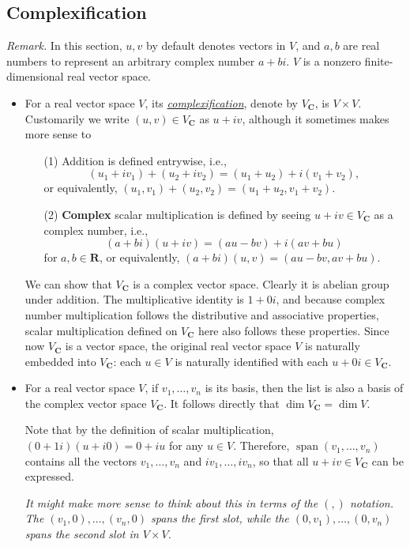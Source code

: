 \documentclass{article}
\newcommand{\df}[1]{\ul{\textit{#1}}}
\newcommand{\R}{\mathbf{R}}
\newcommand{\C}{\mathbf{C}}
\newcommand{\s}{\operatorname{span}}
\renewcommand{\d}{\dim}
\begin{document}
\subsection{Complexification}
\textit{Remark.} In this section, $u,v$ by default denotes vectors in $V$, and $a,b$ are real numbers to represent an arbitrary complex number $a+bi$. $V$ is a nonzero finite-dimensional real vector space.
\begin{itemize}
    \item For a real vector space $V$, its \df{complexification}, denote by $V_\C$, is $V \times V$. Customarily we write $(u,v) \in V_\C$ as $u + iv$, although it sometimes makes more sense to \emph{}
    \begin{enumerate}
        \item [(1)] Addition is defined entrywise, i.e., \[(u_1+iv_1)+(u_2+iv_2)=(u_1+u_2)+i(v_1+v_2),\] or equivalently, $(u_1,v_1)+(u_2,v_2) = (u_1+u_2,v_1+v_2)$.
        \item [(2)] \textbf{Complex} scalar multiplication is defined by seeing $u+iv \in V_\C$ as a complex number, i.e., \[(a+bi)(u+iv) = (au-bv)+i(av+bu)\] for $a,b \in \R$, or equivalently, $(a+bi)(u,v) = (au-bv,av+bu)$.
    \end{enumerate}

    We can show that $V_\C$ is a complex vector space. Clearly it is abelian group under addition. The multiplicative identity is $1+0i$, and because complex number multiplication follows the distributive and associative properties, scalar multiplication defined on $V_\C$ here also follows these properties. Since now $V_\C$ is a vector space, the original real vector space $V$ is naturally embedded into $V_\C$: each $u \in V$ is naturally identified with each $u+0i \in V_\C$.
    \item For a real vector space $V$, if $v_1,\dots,v_n$ is its basis, then the list is also a basis of the complex vector space $V_\C$. It follows directly that $\d V_\C = \d V$.

    Note that by the definition of scalar multiplication, $(0+1i)(u+i0) = 0+iu$ for any $u \in V$. Therefore, $\s(v_1,\dots,v_n)$ contains all the vectors $v_1,\dots,v_n$ and $iv_1,\dots,iv_n$, so that all $u+iv \in V_\C$ can be expressed.
    
    \emph{It might make more sense to think about this in terms of the $(,)$ notation. The $(v_1,0),\dots,(v_n,0)$ spans the first slot, while the $(0,v_1),\dots,(0,v_n)$ spans the second slot in $V \times V$.}


\end{itemize}
\end{document}
